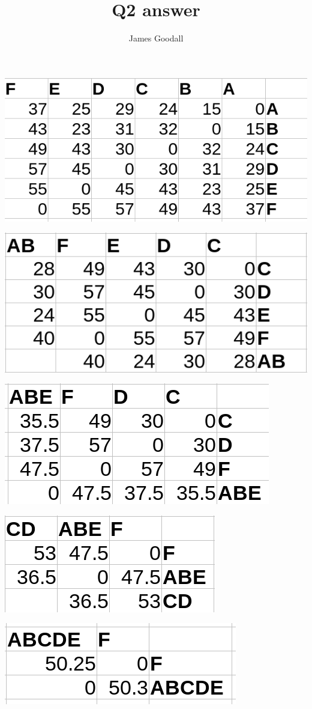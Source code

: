 \documentclass{article}
\title{Q2 answer}
\author{James Goodall}
\begin{document}
\maketitle

\includegraphics{1.png}

\includegraphics{2.png}

\includegraphics{3.png}

\includegraphics{4.png}

\includegraphics{5.png}


\end{document}

